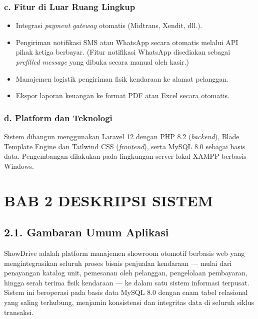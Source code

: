 \documentclass[11pt, a5paper]{article}
\begin{document}
\subsubsection*{c. Fitur di Luar Ruang Lingkup}

\begin{itemize}
  \item Integrasi \textit{payment gateway} otomatis (Midtrans, Xendit, dll.).
  \item Pengiriman notifikasi SMS atau WhatsApp secara otomatis melalui API
        pihak ketiga berbayar. (Fitur notifikasi WhatsApp disediakan sebagai
        \textit{prefilled message} yang dibuka secara manual oleh kasir.)
  \item Manajemen logistik pengiriman fisik kendaraan ke alamat pelanggan.
  \item Ekspor laporan keuangan ke format PDF atau Excel secara otomatis.
\end{itemize}

\subsubsection*{d. Platform dan Teknologi}

Sistem dibangun menggunakan Laravel 12 dengan PHP 8.2 (\textit{backend}), Blade
Template Engine dan Tailwind CSS (\textit{frontend}), serta MySQL 8.0 sebagai
basis data. Pengembangan dilakukan pada lingkungan server lokal XAMPP berbasis
Windows.

\newpage

\section*{BAB 2 DESKRIPSI SISTEM}

\subsection*{2.1. Gambaran Umum Aplikasi}

ShowDrive adalah platform manajemen showroom otomotif berbasis web yang
mengintegrasikan seluruh proses bisnis penjualan kendaraan — mulai dari
penayangan katalog unit, pemesanan oleh pelanggan, pengelolaan pembayaran,
hingga serah terima fisik kendaraan — ke dalam satu sistem informasi terpusat.
Sistem ini beroperasi pada basis data MySQL 8.0 dengan enam tabel relasional yang
saling terhubung, menjamin konsistensi dan integritas data di seluruh siklus
transaksi.
\end{document}
